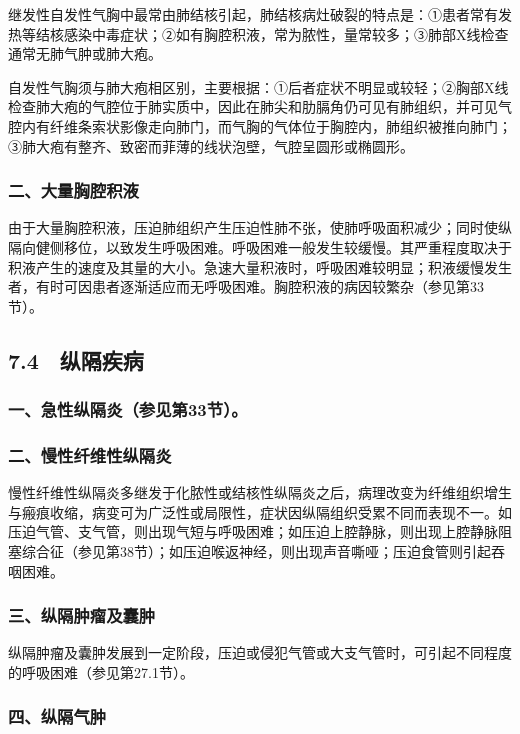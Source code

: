 继发性自发性气胸中最常由肺结核引起，肺结核病灶破裂的特点是：①患者常有发热等结核感染中毒症状；②如有胸腔积液，常为脓性，量常较多；③肺部X线检查通常无肺气肿或肺大疱。

自发性气胸须与肺大疱相区别，主要根据：①后者症状不明显或较轻；②胸部X线检查肺大疱的气腔位于肺实质中，因此在肺尖和肋膈角仍可见有肺组织，并可见气腔内有纤维条索状影像走向肺门，而气胸的气体位于胸腔内，肺组织被推向肺门；③肺大疱有整齐、致密而菲薄的线状泡壁，气腔呈圆形或椭圆形。

\subsubsection{二、大量胸腔积液}

由于大量胸腔积液，压迫肺组织产生压迫性肺不张，使肺呼吸面积减少；同时使纵隔向健侧移位，以致发生呼吸困难。呼吸困难一般发生较缓慢。其严重程度取决于积液产生的速度及其量的大小。急速大量积液时，呼吸困难较明显；积液缓慢发生者，有时可因患者逐渐适应而无呼吸困难。胸腔积液的病因较繁杂（参见第33节）。

\protect\hypertarget{text00048.html}{}{}

\subsection{7.4　纵隔疾病}

\subsubsection{一、急性纵隔炎（参见第33节）。}

\subsubsection{二、慢性纤维性纵隔炎}

慢性纤维性纵隔炎多继发于化脓性或结核性纵隔炎之后，病理改变为纤维组织增生与瘢痕收缩，病变可为广泛性或局限性，症状因纵隔组织受累不同而表现不一。如压迫气管、支气管，则出现气短与呼吸困难；如压迫上腔静脉，则出现上腔静脉阻塞综合征（参见第38节）；如压迫喉返神经，则出现声音嘶哑；压迫食管则引起吞咽困难。

\subsubsection{三、纵隔肿瘤及囊肿}

纵隔肿瘤及囊肿发展到一定阶段，压迫或侵犯气管或大支气管时，可引起不同程度的呼吸困难（参见第27.1节）。

\subsubsection{四、纵隔气肿}

